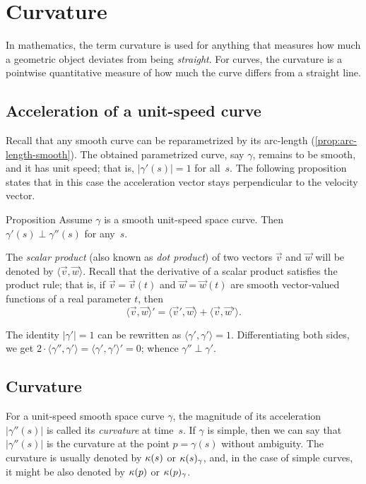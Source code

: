 \chapter{Curvature}
\label{chap:curve-curvature}

In mathematics, the term curvature is used for anything that measures how much a geometric object deviates from being \textit{straight}.
For curves, the curvature is a pointwise quantitative measure of how much the curve differs from a straight line.




\section{Acceleration of a unit-speed curve}

Recall that any smooth curve can be reparametrized by its arc-length (\ref{prop:arc-length-smooth}).
The obtained parametrized curve, say $\gamma$, remains to be smooth, and it has unit speed; 
that is, $|\gamma'(s)|=1$ for all~$s$.
The following proposition states that in this case
the acceleration vector stays perpendicular to the velocity vector.

\begin{thm}{Proposition}\label{prop:a'-pertp-a''}
Assume $\gamma$ is a smooth unit-speed space curve.
Then $\gamma'(s)\perp \gamma''(s)$ for any~$s$.
\end{thm}

The \emph{scalar product} (also known as \textit{dot product}) of two vectors $\vec v$ and $\vec w$ will be denoted by $\langle \vec v,\vec w\rangle$.
Recall that the derivative of a scalar product satisfies the product rule;
that is, if $\vec v=\vec v(t)$ and $\vec w=\vec w(t)$ are smooth vector-valued functions of a real parameter $t$, then
\[\langle \vec v,\vec w\rangle'=\langle \vec v',\vec w\rangle+\langle \vec v,\vec w'\rangle.\]

The identity $|\gamma'|=1$ can be rewritten as $\langle\gamma',\gamma'\rangle=1$.
Differentiating both sides, we get
$2\cdot\langle\gamma'',\gamma'\rangle=\langle\gamma',\gamma'\rangle'=0$;
whence $\gamma''\perp\gamma'$.
\qeds

\section{Curvature}\label{sec:curvature}

For a unit-speed smooth space curve $\gamma$, the magnitude of its acceleration $|\gamma''(s)|$ is called its \emph{curvature} at  time~$s$.
If $\gamma$ is simple, then we can say that $|\gamma''(s)|$ is the curvature at the point $p=\gamma(s)$ without ambiguity.
The curvature is usually denoted by $\kappa(s)$ or $\kappa(s)_\gamma$, and, in the case of simple curves, it might be also denoted by $\kappa(p)$ or $\kappa(p)_\gamma$.



